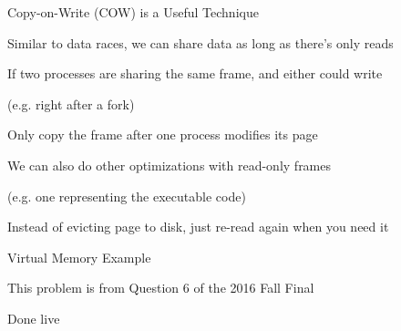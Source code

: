   \begin{frame}{Copy-on-Write (COW) is a Useful Technique}

    Similar to data races, we can share data as long as there's only reads

    \vspace{2em}

    If two processes are sharing the same frame, and either could write
    
    (e.g. right after a fork)

    \hspace{2em} Only copy the frame after one process modifies its page

    \vspace{2em}

    We can also do other optimizations with read-only frames
    
    (e.g. one representing the executable code)

    \hspace{2em} Instead of evicting page to disk, just re-read again when you
                 need it
  \end{frame}

  \begin{frame}{Virtual Memory Example}

    This problem is from Question 6 of the 2016 Fall Final

    \vspace{2em}

    Done live
  \end{frame}

